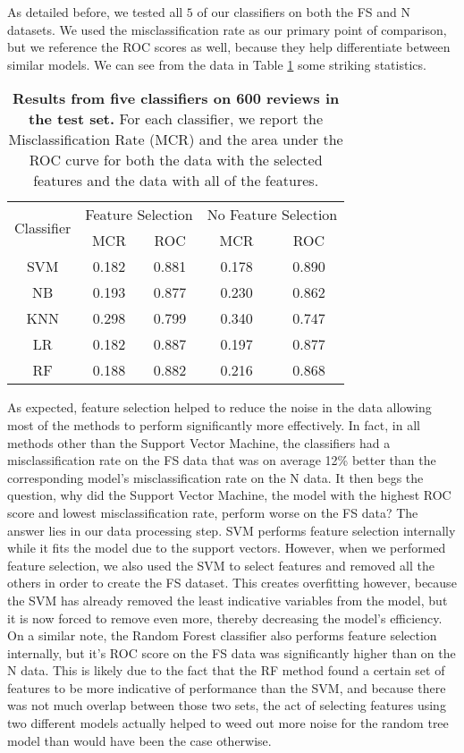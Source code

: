 \documentclass{article} %
\begin{document}
As detailed before, we tested all $5$ of our classifiers on both the FS and N datasets. We used the misclassification rate as our primary point of comparison, but we reference the ROC scores as well, because they help differentiate between similar models. We can see from the data in Table \ref{tab:data} some striking statistics. \\
\begin{table}[htb]
\begin{center}
\begin{tabular}{|c|c|c|c|c|} 
 \hline
 \multirow{2}{*}{Classifier} & \multicolumn{2}{|c|}{Feature Selection} & \multicolumn{2}{|c|}{No Feature Selection} \\
 \cline{2-5}
          & MCR & ROC & MCR & ROC \\ [0.5ex] 
\hline\hline
SVM & 0.182 & 0.881 & 0.178 & 0.890 \\
\hline
NB    & 0.193 & 0.877 & 0.230 & 0.862 \\
\hline
KNN & 0.298 & 0.799 & 0.340 & 0.747 \\
\hline
LR    & 0.182 & 0.887 & 0.197 & 0.877 \\
\hline
RF    & 0.188 & 0.882 & 0.216 & 0.868 \\
\hline
\end{tabular}
\caption{\label{tab:data}\textbf{Results from five classifiers on 600 reviews in the test set.} For each classifier, we report the Misclassification Rate (MCR) and the area under the ROC curve for both the data with the selected features and the data with all of the features.}
\end{center}
\vspace*{-3mm}
\end{table}

As expected, feature selection helped to reduce the noise in the data allowing most of the methods to perform significantly more effectively. In fact, in all methods other than the Support Vector Machine, the classifiers had a misclassification rate on the FS data that was on average 12\% better than the corresponding model's misclassification rate on the N data. It then begs the question, why did the Support Vector Machine, the model with the highest ROC score and lowest misclassification rate, perform worse on the FS data? The answer lies in our data processing step. SVM performs feature selection internally while it fits the model due to the support vectors. However, when we performed feature selection, we also used the SVM to select features and removed all the others in order to create the FS dataset. This creates overfitting however, because the SVM has already removed the least indicative variables from the model, but it is now forced to remove even more, thereby decreasing the model's efficiency. On a similar note, the Random Forest classifier also performs feature selection internally, but it's ROC score on the FS data was significantly higher than on the N data. This is likely due to the fact that the RF method found a certain set of features to be more indicative of performance than the SVM, and because there was not much overlap between those two sets, the act of selecting features using two different models actually helped to weed out more noise for the random tree model than would have been the case otherwise.
\end{document}
